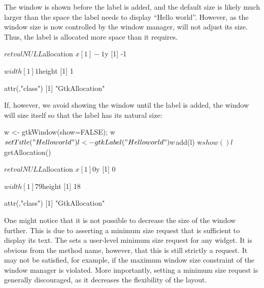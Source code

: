 %
The window is shown before the label is added, and the default size is
likely much larger than the space the label needs to display ``Hello
world''. However, as the window size is now controlled by the window
manager,  will not adjust its size. Thus, the label
is allocated more space than it requires.
\begin{Schunk}
\begin{Soutput}
$retval
NULL

$allocation
$x
[1] -1

$y
[1] -1

$width
[1] 1

$height
[1] 1

attr(,"class")
[1] "GtkAllocation"
\end{Soutput}
\end{Schunk}
%
If, however, we avoid showing the window until the label is added, the
window will size itself so that the label has its natural size:
\begin{Schunk}
\begin{Sinput}
 w <- gtkWindow(show=FALSE); w$setTitle("Hello world")
 l <- gtkLabel("Hello world")
 w$add(l)
 w$show()
 l$getAllocation()
\end{Sinput}
\begin{Soutput}
$retval
NULL

$allocation
$x
[1] 0

$y
[1] 0

$width
[1] 79

$height
[1] 18

attr(,"class")
[1] "GtkAllocation"
\end{Soutput}
\end{Schunk}
%
One might notice that it is not possible to decrease the size of the
window further. This is due to  asserting a minimum
size request that is sufficient to display its text. The
 sets a user-level minimum size 
request for any widget. It is obvious from the method name, however,
that this is still strictly a request. It may not be satisfied, for
example, if the maximum window size constraint of the window manager
is violated. More importantly, setting a minimum size request is
generally discouraged, as it decreases the flexibility of the layout.

